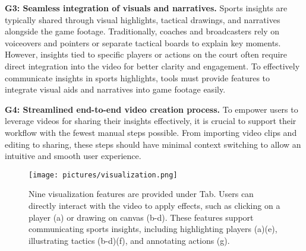 \textbf{G3: Seamless integration of visuals and narratives.} Sports insights are typically shared through visual highlights, tactical drawings, and narratives alongside the game footage. Traditionally, coaches and broadcasters rely on voiceovers and pointers or separate tactical boards to explain key moments. However, insights tied to specific players or actions on the court often require direct integration into the video for better clarity and engagement.
To effectively communicate insights in sports highlights, tools must provide features to integrate visual aids and narratives into game footage easily.


\textbf{G4: Streamlined end-to-end video creation process.}
To empower users to leverage videos for sharing their insights effectively, it is crucial to support their workflow with the fewest manual steps possible. From importing video clips and editing to sharing, these steps should have minimal context switching to allow an intuitive and smooth user experience. 




\begin{figure}[t!]
    \centering
    \texttt{[image: pictures/visualization.png]}
    \vspace{-5mm}
    \caption{Nine visualization features are provided under \Highlight{} Tab. Users can directly interact with the video to apply effects, such as clicking on a player (a) or drawing on canvas (b-d). These features support communicating sports insights, including highlighting players (a)(e), illustrating tactics (b-d)(f), and annotating actions (g).} 
    \label{fig:vis-feature}
    \vspace{-3mm}
\end{figure}

